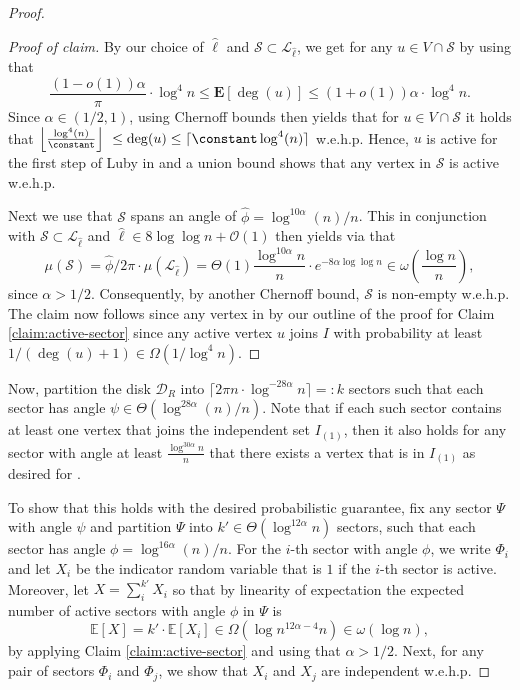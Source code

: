 \documentclass[letterpaper,11pt]{article}
\newcommand{\E}[1]{\mathbf{E}\left[#1\right]}
\newcommand{\Exp}[1]{\mathbb{E}\left[#1\right]}
\newcommand{\wehp}{w.e.h.p.\xspace}
\newcommand{\disk}{\ensuremath{\mathcal D_R}\xspace}
\newcommand{\1}{\mathbb I}
\newcommand{\bigO}{\mathcal{O}}
\newcommand{\Layer}[1]{\mathcal{L}_{#1}}
\begin{document}
\begin{proof}
{\begin{proof}[Proof of claim]
    By our choice of $\hat{\ell}$ and $\mathcal{S} \subset \Layer{\hat{\ell}}$, we get for any $u \in V \cap \mathcal{S}$ by using  that
%
\begin{equation*} %
\frac{ (1-o(1))\alpha}{\pi} \cdot \log^4 n  \leq \E{\deg(u)} \leq (1+o(1))\alpha \cdot \log^4 n.
\end{equation*}
%
Since $\alpha \in (1/2, 1)$, using Chernoff bounds then yields that for $u \in V \cap \mathcal{S}$ it holds that  $\left\lfloor\frac{\log^{4}(n)}{\constant}\right\rfloor\ \leq \deg(u) \leq \lceil\constant \log^{4}(n) \rceil$ \wehp Hence, $u$ is active for the first step of Luby in \algo and a union bound shows that any vertex in $\mathcal{S}$ is active \wehp

Next we use that $\mathcal{S}$ spans an angle of $\hat{\phi}=\log^{10\alpha}(n)/n$. This in conjunction with $\mathcal{S} \subset \Layer{\hat{\ell}}$ and $\hat{\ell} \in 8\log\log n + \bigO(1)$ then yields via  that
%
$$
\mu(\mathcal{S}) = \hat{\phi}/2\pi \cdot \mu(\Layer{\hat{\ell}}) =\Theta(1)\frac{\log^{10\alpha}n}{n} \cdot e^{-8\alpha \log\log n}  \in  \omega\left(\frac{\log n}{n}\right),
$$
%
since $\alpha > 1/2$. Consequently, by another Chernoff bound, $\mathcal{S}$ is non-empty \wehp The claim now follows since any vertex in by our outline of the proof for Claim \ref{claim:active-sector} since any active vertex $u$ joins $I$ with probability at least $1/(\deg(u) +1) \in \Omega(1/\log^4 n)$.
\end{proof}}

Now, partition the disk $\disk$ into $\lceil 2\pi n \cdot \log ^{-28\alpha } n\rceil =: k$ sectors such that each sector has angle $\psi \in \Theta( \log ^{28\alpha } (n)/n)$. Note that if each such sector contains at least one vertex that joins the independent set $I_{(1)}$, then it also holds for any sector with angle at least $\frac{\log^{30\alpha}n}{n}$ that there exists a vertex that is in $I_{(1)}$ as desired for .

To show that this holds with the desired probabilistic guarantee, fix any sector $\Psi$ with angle $\psi$ and partition $\Psi$ into $k' \in \Theta(\log ^{12\alpha }n)$ sectors, such that each sector has angle $\phi = \log ^{16\alpha }(n) /n $. For the $i$-th sector with angle $\phi$, we write $\Phi_i$ and let $X_i$ be the indicator random variable that is $1$ if the $i$-th sector is active. Moreover, let $X = \sum_{i}^{k'}{X_i}$ so that by linearity of expectation the expected number of active sectors with angle $\phi$ in $\Psi$ is $$\Exp{X} = k' \cdot\Exp{X_i} \in \Omega(\log n^{12\alpha - 4}n) \in \omega(\log n),$$ by applying Claim \ref{claim:active-sector} and using that $\alpha > 1/2$. Next, for any pair of sectors $\Phi_i$ and $\Phi_j$, we show that $X_i$ and $X_j$ are independent \wehp


\end{proof}
\end{document}
